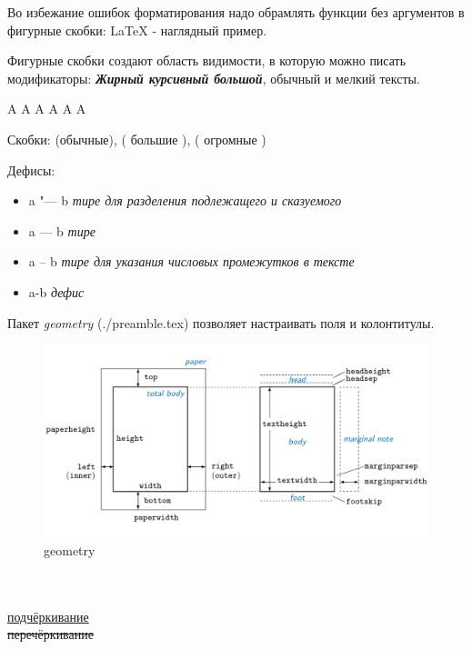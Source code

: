 Во избежание ошибок форматирования надо обрамлять функции без аргументов в
фигурные скобки: {\LaTeX} - наглядный пример.

Фигурные скобки создают область видимости, в которую можно писать модификаторы:
{\bfseries \itshape \Large Жирный курсивный большой}, обычный и {\small
мелкий} тексты.

\Huge A
\LARGE A
\Large A
\large A
\normalsize A
\small A

Скобки: (обычные), \big( большие \big), \bigg( огромные \bigg)

Дефисы:
\begin{itemize}
  \item a "--- b \textit{тире для разделения подлежащего и сказуемого}
  \item a --- b \textit{тире}
  \item a -- b \textit{тире для указания числовых промежутков в тексте}
  \item a-b \textit{дефис}
\end{itemize}


Пакет \textit{geometry} (./preamble.tex) позволяет настраивать поля и
колонтитулы.
\begin{figure}[h!]
  \centering
  \includegraphics[width=1\textwidth]{./images/geometry}
  \caption{geometry}
  \label{figure:geometry}
\end{figure}

\\
\\
\ul{подчёркивание}\\
\st{перечёркивание}

